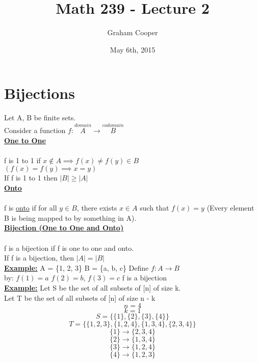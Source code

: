 \documentclass[12pt]{article}
\title{\vspace{-15ex}Math 239 - Lecture 2\vspace{-1ex}}
\date{May 6th, 2015}
\author{Graham Cooper}
\newcommand{\myt}[1]{\textbf{\underline{#1}}}
\begin{document}
	\maketitle
	\section*{Bijections}
	Let A, B be finite sets.\\
	Consider a function $f: \overset{domain}{A} \rightarrow \overset{codomain}{B}$\\
	
	\myt{One to One}\\\\
	f is 1 to 1 if $x \not \in A \implies f(x) \neq f(y) \in B$\\
	$(f(x) = f(y) \implies x = y )$\\
	
	
	If f is 1 to 1 then $|B| \geq |A|$\\
	
	\myt{Onto}\\\\
	f is \underline{onto} if for all $y \in B$, there exists $x \in A$ such that $f(x) = y$ (Every element B is being mapped to by something in A).\\
	
	
	\myt{Bijection (One to One and Onto)}\\\\
	f is a bijection if f is one to one and onto.\\
	If f is a bijection, then $|A| = |B|$\\
	
	
	\myt{Example:} A = \{1, 2, 3\} B = \{a, b, c\} Define $f: A \rightarrow B$\\
	by: $f(1) = a$ $f(2) = b$, $f(3) = c$ f is a bijection\\
	
	\myt{Example:} Let S be the set of all subsets of [n] of size k.\\
	Let T be the set of all subsets of [n] of size n - k\\
	
	$$n = 4$$
	$$k = 1$$
	$$S = \{\{1\}, \{2\}, \{3\}, \{4\} \}$$
	$$T = \{\{1,2,3\},\{1,2,4\},\{1,3,4\},\{2,3,4\}\}$$
	$$\{1\} \rightarrow \{2,3,4\}$$
	$$\{2\} \rightarrow \{1,3,4\}$$
	$$\{3\} \rightarrow \{1,2,4\}$$
	$$\{4\} \rightarrow \{1,2,3\}$$\\
	
\end{document}
